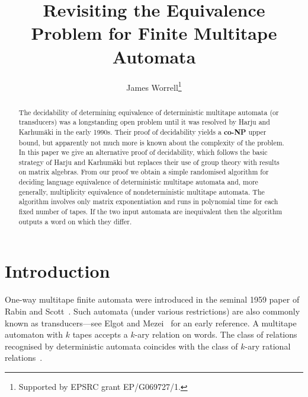 \documentclass[runningheads]{llncs}
\begin{document}
\title{Revisiting the Equivalence Problem for Finite Multitape Automata}
\author{ James
  Worrell\thanks{Supported by EPSRC grant EP/G069727/1.}}

\maketitle

\begin{abstract}
  The decidability of determining equivalence of deterministic
  multitape automata (or transducers) was a longstanding open problem
  until it was resolved by Harju and Karhum\"{a}ki in the early 1990s.
  Their proof of decidability yields a \textbf{co-NP} upper bound, but
  apparently not much more is known about the complexity of the
  problem.  In this paper we give an alternative proof of
  decidability, which follows the basic strategy of Harju and
  Karhum\"{a}ki but replaces their use of group theory with results on
  matrix algebras.  From our proof we obtain a simple randomised
  algorithm for deciding language equivalence of deterministic
  multitape automata and, more generally, multiplicity equivalence of
  nondeterministic multitape automata.  The algorithm involves only
  matrix exponentiation and runs in polynomial time for each fixed
  number of tapes.  If the two input automata are inequivalent then
  the algorithm outputs a word on which they differ.
\end{abstract}

\section{Introduction}
One-way multitape finite automata were introduced in the seminal 1959
paper of Rabin and Scott~\cite{RabinS59}.  Such automata (under
various restrictions) are also commonly known as transducers---see
Elgot and Mezei~\cite{ElgotM63} for an early reference.  A multitape
automaton with $k$ tapes accepts a $k$-ary relation on words.  The
class of relations recognised by deterministic automata coincides with
the class of $k$-ary rational relations~\cite{ElgotM63}.
\end{document}
